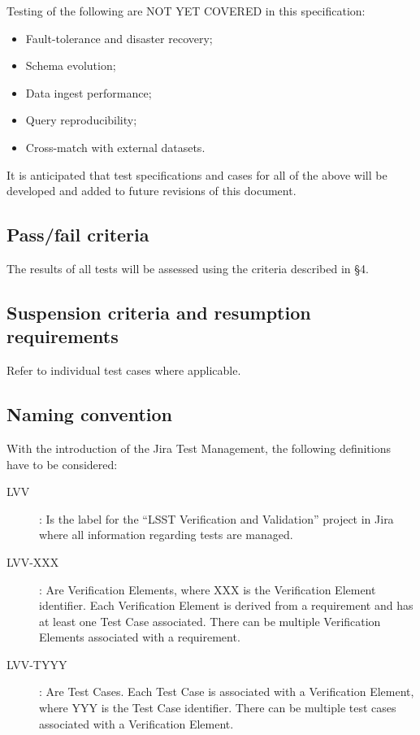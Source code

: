\documentclass[DM,lsstdraft,STS,toc]{lsstdoc}
\begin{document}
Testing of the following are NOT YET COVERED in this specification:

\begin{itemize}
  \item{Fault-tolerance and disaster recovery;}
  \item{Schema evolution;}
  \item{Data ingest performance;}
  \item{Query reproducibility;}
  \item{Cross-match with external datasets.}
\end{itemize}

It is anticipated that test specifications and cases for all of the above will be developed
and added to future revisions of this document.

\subsection{Pass/fail criteria}
\label{sec:passfail}

The results of all tests will be assessed using the criteria described in  \S4.

\subsection{Suspension criteria and resumption requirements}
\label{suspension}

Refer to individual test cases where applicable.

\subsection{Naming convention}

With the introduction of the Jira Test Management, the following definitions have to be considered:

\begin{description}
  \item[LVV]{: Is the label for the ``LSST Verification and Validation'' project in Jira where all information regarding tests are managed.}
  \item[LVV-XXX]{: Are Verification Elements, where XXX is the Verification Element identifier.  Each Verification Element is derived from a requirement and has at least one Test Case associated. There can be multiple Verification Elements associated with a requirement.}
  \item[LVV-TYYY]{: Are Test Cases. Each Test Case is associated with a Verification Element, where YYY is the Test Case identifier. There can be multiple test cases associated with a Verification Element.}
\end{description}
\end{document}
